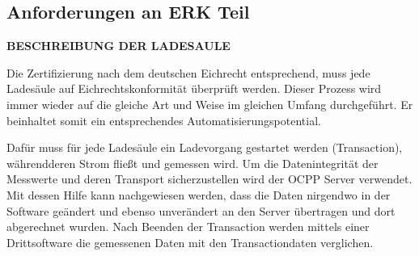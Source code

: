 \subsection{Anforderungen an ERK Teil}
    \textbf{BESCHREIBUNG DER LADESAULE}

    Die Zertifizierung nach dem deutschen Eichrecht entsprechend, muss jede Ladesäule auf Eichrechtskonformität überprüft werden.
    Dieser Prozess wird immer wieder auf die gleiche Art und Weise im gleichen Umfang durchgeführt. Er beinhaltet somit ein entsprechendes Automatisierungspotential.
  
    Dafür muss für jede Ladesäule ein Ladevorgang gestartet werden (Transaction), währendderen Strom fließt und gemessen wird.   Um die Datenintegrität der Messwerte und deren Transport sicherzustellen wird der OCPP Server verwendet. Mit dessen Hilfe kann nachgewiesen werden, 
    dass die Daten nirgendwo in der Software geändert und ebenso unverändert an den Server übertragen und dort abgerechnet wurden. 
    Nach Beenden der Transaction werden mittels einer Drittsoftware die gemessenen Daten mit den Transactiondaten verglichen.

